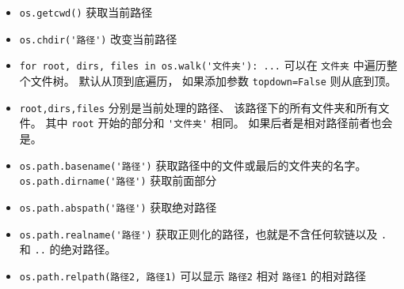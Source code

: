
\begin{issues}
\issueDraft
\end{issues}

\begin{itemize}
\item \verb`os.getcwd()` 获取当前路径
\item \verb`os.chdir('路径')` 改变当前路径 
\item \verb`for root, dirs, files in os.walk('文件夹'): ...` 可以在 \verb`文件夹` 中遍历整个文件树。 默认从顶到底遍历， 如果添加参数 \verb`topdown=False` 则从底到顶。
\item \verb`root,dirs,files` 分别是当前处理的路径、 该路径下的所有文件夹和所有文件。 其中 \verb`root` 开始的部分和 \verb`'文件夹'` 相同。 如果后者是相对路径前者也会是。
\item \verb`os.path.basename('路径')` 获取路径中的文件或最后的文件夹的名字。 \verb`os.path.dirname('路径')` 获取前面部分
\item \verb`os.path.abspath('路径')` 获取绝对路径
\item \verb`os.path.realname('路径')` 获取正则化的路径，也就是不含任何软链以及 \verb`.` 和 \verb`..` 的绝对路径。
\item \verb`os.path.relpath(路径2, 路径1)` 可以显示 \verb`路径2` 相对 \verb`路径1` 的相对路径
\end{itemize}

